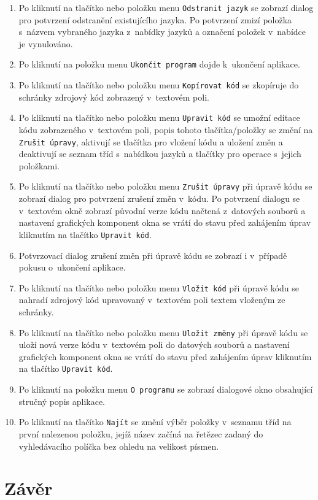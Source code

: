 \documentclass[czech,BP]{thesiskiv}
\begin{document}
\begin{enumerate}
\item{Po kliknutí na tlačítko nebo položku menu \texttt{Odstranit jazyk} se zobrazí dialog pro potvrzení odstranění existujícího jazyka. Po potvrzení zmizí položka s~názvem vybraného jazyka z~nabídky jazyků a označení položek v~nabídce je vynulováno.}
\item{Po kliknutí na položku menu \texttt{Ukončit program} dojde k~ukončení aplikace.}
\item{Po kliknutí na tlačítko nebo položku menu \texttt{Kopírovat kód} se zkopíruje do schránky zdrojový kód zobrazený v~textovém poli.}
\item{Po kliknutí na tlačítko nebo položku menu \texttt{Upravit kód} se umožní editace kódu zobrazeného v~textovém poli, popis tohoto tlačítka/položky se změní na \texttt{Zrušit úpravy}, aktivují se tlačítka pro vložení kódu a uložení změn a deaktivují se seznam tříd s~nabídkou jazyků a tlačítky pro operace s~jejich položkami.}
\item{Po kliknutí na tlačítko nebo položku menu \texttt{Zrušit úpravy} při úpravě kódu se zobrazí dialog pro potvrzení zrušení změn v~kódu. Po potvrzení dialogu se v~textovém okně zobrazí původní verze kódu načtená z~datových souborů a nastavení grafických komponent okna se vrátí do stavu před zahájením úprav kliknutím na tlačítko \texttt{Upravit kód}.} \item{Potvrzovací dialog zrušení změn při úpravě kódu se zobrazí i v~případě pokusu o~ukončení aplikace.}
\item{Po kliknutí na tlačítko nebo položku menu \texttt{Vložit kód} při úpravě kódu se nahradí zdrojový kód upravovaný v~textovém poli textem vloženým ze schránky.}
\item{Po kliknutí na tlačítko nebo položku menu \texttt{Uložit změny} při úpravě kódu se uloží nová verze kódu v~textovém poli do datových souborů a nastavení grafických komponent okna se vrátí do stavu před zahájením úprav kliknutím na tlačítko \texttt{Upravit kód}.}
\item{Po kliknutí na položku menu \texttt{O~programu} se zobrazí dialogové okno obsahující stručný popis aplikace.}
\item{Po kliknutí na tlačítko \texttt{Najít} se změní výběr položky v~seznamu tříd na první nalezenou položku, jejíž název začíná na řetězec zadaný do vyhledávacího políčka bez ohledu na velikost písmen.}
\end{enumerate}

\chapter{Závěr}
\end{document}
